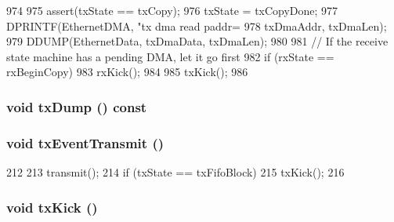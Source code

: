 \begin{DoxyCode}
974 {
975     assert(txState == txCopy);
976     txState = txCopyDone;
977     DPRINTF(EthernetDMA, "tx dma read paddr=%
978             txDmaAddr, txDmaLen);
979     DDUMP(EthernetData, txDmaData, txDmaLen);
980 
981     // If the receive state machine  has a pending DMA, let it go first
982     if (rxState == rxBeginCopy)
983         rxKick();
984 
985     txKick();
986 }
\end{DoxyCode}
\hypertarget{classSinic_1_1Device_afe787c5d7928546256f34b65f485be32}{
\subsubsection[{txDump}]{\setlength{\rightskip}{0pt plus 5cm}void txDump () const}}
\label{classSinic_1_1Device_afe787c5d7928546256f34b65f485be32}
\hypertarget{classSinic_1_1Device_a2b61c48d7a63b50007517c67e35dfd20}{
\subsubsection[{txEventTransmit}]{\setlength{\rightskip}{0pt plus 5cm}void txEventTransmit ()}}
\label{classSinic_1_1Device_a2b61c48d7a63b50007517c67e35dfd20}



\begin{DoxyCode}
212     {
213         transmit();
214         if (txState == txFifoBlock)
215             txKick();
216     }
\end{DoxyCode}
\hypertarget{classSinic_1_1Device_ac5484e8debdd6a2d3cf4c2902b832a76}{
\subsubsection[{txKick}]{\setlength{\rightskip}{0pt plus 5cm}void txKick ()}}
\label{classSinic_1_1Device_ac5484e8debdd6a2d3cf4c2902b832a76}


